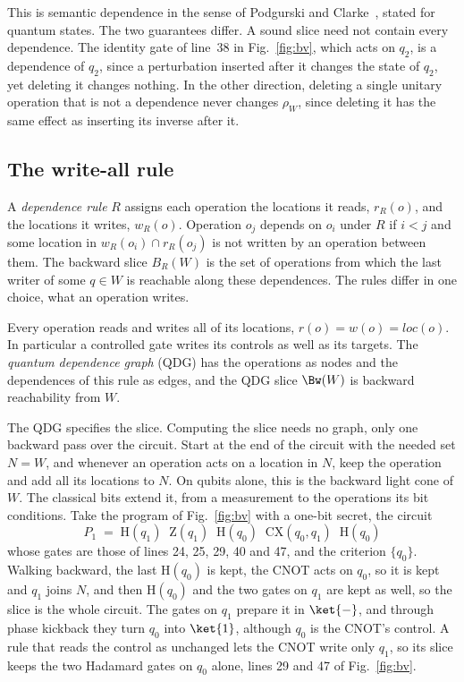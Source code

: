 This is semantic dependence in the sense of Podgurski and Clarke~\cite{podgurski1990formal}, stated for quantum
states. The two guarantees differ. A sound slice need not contain every dependence. The identity gate of line~38 in
Fig.~\ref{fig:bv}, which acts on $q_2$, is a dependence of $q_2$, since a perturbation inserted after it changes the
state of $q_2$, yet deleting it changes nothing. In the other direction, deleting a single unitary operation that is not a dependence never changes
$\rho_W$, since deleting it has the same effect as inserting its inverse after it.

\subsection{The write-all rule}
A \emph{dependence rule} $R$ assigns each operation the locations it reads, $r_R(o)$, and the locations it writes,
$w_R(o)$. Operation $o_j$ depends on $o_i$ under $R$ if $i < j$ and some location in $w_R(o_i) \cap r_R(o_j)$ is
not written by an operation between them. The backward slice $B_R(W)$ is the set of operations from which the
last writer of some $q \in W$ is reachable along these dependences. The rules differ in one choice, what an
operation writes.

\begin{definition}\label{def:writeall}
Every operation reads and writes all of its locations, $r(o) = w(o) = \mathit{loc}(o)$. In particular a
controlled gate writes its controls as well as its targets. The \emph{quantum dependence graph} (QDG) has the
operations as nodes and the dependences of this rule as edges, and the QDG slice $\Bw(W)$ is backward
reachability from $W$.
\end{definition}

The QDG specifies the slice. Computing the slice needs no graph, only one backward pass over the circuit. Start at the end of the circuit with the needed set $N = W$, and
whenever an operation acts on a location in $N$, keep the operation and add all its locations to $N$. On qubits
alone, this is the backward light cone of $W$. The classical bits extend it, from a measurement to the
operations its bit conditions. Take the program of Fig.~\ref{fig:bv} with a one-bit secret, the circuit
\[
P_1 \;=\; \mathrm{H}(q_1)\;\; \mathrm{Z}(q_1)\;\; \mathrm{H}(q_0)\;\; \mathrm{CX}(q_0, q_1)\;\; \mathrm{H}(q_0)
\]
whose gates are those of lines 24, 25, 29, 40 and 47, and the criterion $\{q_0\}$. Walking backward, the last
$\mathrm{H}(q_0)$ is kept, the CNOT acts on $q_0$, so it is kept and $q_1$ joins $N$, and then $\mathrm{H}(q_0)$ and
the two gates on $q_1$ are kept as well, so the slice is the whole circuit. The gates on $q_1$ prepare it in
$\ket{-}$, and through phase kickback they turn $q_0$ into $\ket{1}$, although $q_0$ is the CNOT's control. A rule
that reads the control as unchanged lets the CNOT write only $q_1$, so its slice keeps the two Hadamard gates on $q_0$
alone, lines 29 and 47 of Fig.~\ref{fig:bv}.

